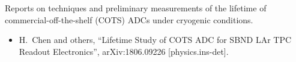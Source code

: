 \documentclass[12pt]{article}
\begin{document}
\begin{thebibliography}{1}
Reports on techniques and preliminary measurements of the lifetime of commercial-off-the-shelf (COTS) ADCs under cryogenic conditions.
\begin{itemize}
\item H.~Chen and others, ``Lifetime Study of COTS ADC for SBND LAr TPC Readout Electronics'',
arXiv:1806.09226 [physics.ins-det].
\end{itemize}
 
\end{thebibliography}
\end{document}
